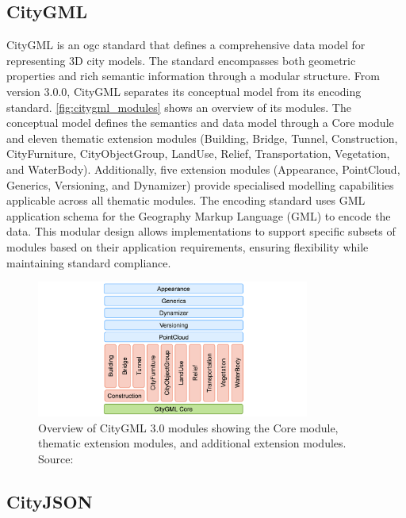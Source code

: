 \subsection{CityGML}
\label{rw:citygml}
CityGML is an \ac{ogc} standard \citep{CityGML} that defines a comprehensive data model for representing 3D city models. The standard encompasses both geometric properties and rich semantic information through a modular structure. From version 3.0.0, CityGML separates its conceptual model from its encoding standard. \autoref{fig:citygml_modules} shows an overview of its modules. The conceptual model defines the semantics and data model through a Core module and eleven thematic extension modules (Building, Bridge, Tunnel, Construction, CityFurniture, CityObjectGroup, LandUse, Relief, Transportation, Vegetation, and WaterBody). Additionally, five extension modules (Appearance, PointCloud, Generics, Versioning, and Dynamizer) provide specialised modelling capabilities applicable across all thematic modules. The encoding standard uses GML application schema for the Geography Markup Language (GML) \citep{gml} to encode the data. This modular design allows implementations to support specific subsets of modules based on their application requirements, ensuring flexibility while maintaining standard compliance.

\begin{figure}[htbp]
  \centering
  \includegraphics[width=0.8\textwidth]{figs/related_work_theoretical_bg/citygml3modules.png}
  \caption[CityGML 3.0 Module Overview]{Overview of CityGML 3.0 modules showing the Core module, thematic extension modules, and additional extension modules. Source: \citep{CityGML}}
  \label{fig:citygml_modules}
\end{figure}

\subsection{CityJSON}
\label{rw:cityjson}

